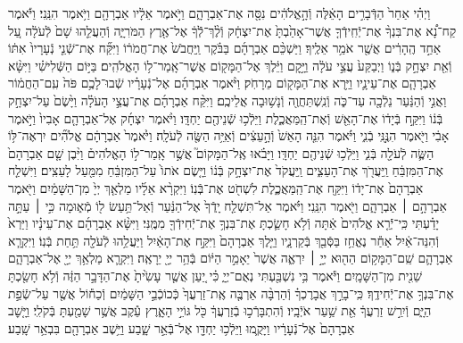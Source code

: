 \documentclass[twoside, openany, parskip=half, 11pt]{book}
\begin{document}
וַיְהִ֗י אַחַר֙ הַדְּֿבָרִ֣ים הָאֵ֔לֶּה  וְֿהָ֣אֱלֹהִ֔ים נִסָּ֖ה אֶת־אַבְרָהָ֑ם וַיֹּ֣אמֶר אֵלָ֔יו אַבְרָהָ֖ם וַיֹּ֥אמֶר הִנֵּֽנִי׃ וַיֹּ֡אמֶר קַח־נָ֠א אֶת־בִּנְךָ֨ אֶת־יְֿחִֽידְֿךָ֤ אֲשֶׁר־אָהַ֙בְתָּ֙ אֶת־יִצְחָ֔ק וְֿלֶ֨ךְ־לְֿֿךָ֔ אֶל־אֶ֖רֶץ הַמֹּרִיָּ֑ה וְֿהַעֲלֵ֤הוּ שָׁם֙ לְֿעֹלָ֔ה עַ֚ל אַחַ֣ד הֶֽהָרִ֔ים אֲשֶׁ֖ר אֹמַ֥ר אֵלֶֽיךָ׃ וַיַּשְׁכֵּ֨ם אַבְרָהָ֜ם בַּבֹּ֗קֶר וַֽיַּחֲבֹשׁ֙ אֶת־חֲמֹר֔וֹ וַיִּקַּ֞ח אֶת־שְֿׁנֵ֤י נְֿעָרָיו֙ אִתּ֔וֹ וְֿאֵ֖ת יִצְחָ֣ק בְּֿנ֑וֹ וַיְבַקַּע֙ עֲצֵ֣י עֹלָ֔ה וַיָּ֣קׇם וַיֵּ֔לֶךְ אֶל־הַמָּק֖וֹם אֲשֶׁר־אָֽמַר־ל֥וֹ הָאֱלֹהִֽים׃ בַּיּ֣וֹם הַשְּֿׁלִישִׁ֗י וַיִּשָּׂ֨א אַבְרָהָ֧ם אֶת־עֵינָ֛יו וַיַּ֥רְא אֶת־הַמָּק֖וֹם מֵרָחֹֽק׃ וַיֹּ֨אמֶר אַבְרָהָ֜ם אֶל־נְֿעָרָ֗יו שְֿׁבוּ־לָכֶ֥ם פֹּה֙ עִֽם־הַחֲמ֔וֹר וַאֲנִ֣י וְֿהַנַּ֔עַר נֵלְֿכָ֖ה עַד־כֹּ֑ה וְֿנִֽשְׁתַּחֲוֶ֖ה וְֿנָשׁ֥וּבָה אֲלֵיכֶֽם׃ וַיִּקַּ֨ח אַבְרָהָ֜ם אֶת־עֲצֵ֣י הָעֹלָ֗ה וַיָּ֙שֶׂם֙ עַל־יִצְחָ֣ק בְּֿנ֔וֹ וַיִּקַּ֣ח בְּֿיָד֔וֹ אֶת־הָאֵ֖שׁ וְֿאֶת־הַֽמַּאֲכֶ֑לֶת וַיֵּלְֿכ֥וּ שְֿׁנֵיהֶ֖ם יַחְדָּֽו׃ וַיֹּ֨אמֶר יִצְחָ֜ק אֶל־אַבְרָהָ֤ם אָבִיו֙ וַיֹּ֣אמֶר אָבִ֔י וַיֹּ֖אמֶר הִנֶּ֣נִּֽי בְֿנִ֑י וַיֹּ֗אמֶר הִנֵּ֤ה הָאֵשׁ֙ וְֿהָ֣עֵצִ֔ים וְֿאַיֵּ֥ה הַשֶּׂ֖ה לְֿעֹלָֽה׃ וַיֹּ֙אמֶר֙ אַבְרָהָ֔ם אֱלֹהִ֞ים יִרְאֶה־לּ֥וֹ הַשֶּׂ֛ה לְֿעֹלָ֖ה בְּֿנִ֑י וַיֵּלְֿכ֥וּ שְֿׁנֵיהֶ֖ם יַחְדָּֽו׃ וַיָּבֹ֗אוּ אֶֽל־הַמָּקוֹם֮ אֲשֶׁ֣ר אָֽמַר־ל֣וֹ הָאֱלֹהִים֒ וַיִּ֨בֶן שָׁ֤ם אַבְרָהָם֙ אֶת־הַמִּזְבֵּ֔חַ וַֽיַּעֲרֹ֖ךְ אֶת־הָעֵצִ֑ים וַֽיַּעֲקֹד֙ אֶת־יִצְחָ֣ק בְּֿנ֔וֹ וַיָּ֤שֶׂם אֹתוֹ֙ עַל־הַמִּזְבֵּ֔חַ מִמַּ֖עַל לָעֵצִֽים׃ וַיִּשְׁלַ֤ח אַבְרָהָם֙ אֶת־יָד֔וֹ וַיִּקַּ֖ח אֶת־הַֽמַּאֲכֶ֑לֶת לִשְׁחֹ֖ט אֶת־בְּֿנֽוֹ׃ וַיִּקְרָ֨א אֵלָ֜יו מַלְאַ֤ךְ יְיָ֙ מִן־הַשָּׁמַ֔יִם וַיֹּ֖אמֶר אַבְרָהָ֣ם ׀ אַבְרָהָ֑ם וַיֹּ֖אמֶר הִנֵּֽנִי׃ וַיֹּ֗אמֶר אַל־תִּשְׁלַ֤ח יָֽדְֿךָ֙ אֶל־הַנַּ֔עַר וְֿאַל־תַּ֥עַשׂ ל֖וֹ מְֿא֑וּמָה כִּ֣י ׀ עַתָּ֣ה יָדַ֗עְתִּי כִּֽי־יְֿֿרֵ֤א אֱלֹהִים֙ אַ֔תָּה וְֿלֹ֥א חָשַׂ֛כְתָּ אֶת־בִּנְךָ֥ אֶת־יְֿחִידְֿךָ֖ מִמֶּֽנִּי׃ וַיִּשָּׂ֨א אַבְרָהָ֜ם אֶת־עֵינָ֗יו וַיַּרְא֙ וְֿהִנֵּה־אַ֔יִל אַחַ֕ר נֶאֱחַ֥ז בַּסְּֿבַ֖ךְ בְּֿקַרְנָ֑יו וַיֵּ֤לֶךְ אַבְרָהָם֙ וַיִּקַּ֣ח אֶת־הָאַ֔יִל וַיַּעֲלֵ֥הוּ לְֿעֹלָ֖ה תַּ֥חַת בְּֿנֽוֹ׃ וַיִּקְרָ֧א אַבְרָהָ֛ם שֵֽׁם־הַמָּק֥וֹם הַה֖וּא יְיָ֣ ׀ יִרְאֶ֑ה אֲשֶׁר֙ יֵאָמֵ֣ר הַיּ֔וֹם בְּֿהַ֥ר יְיָ֖ יֵרָאֶֽה׃ וַיִּקְרָ֛א מַלְאַ֥ךְ יְיָ֖ אֶל־אַבְרָהָ֑ם שֵׁנִ֖ית מִן־הַשָּׁמָֽיִם׃ וַיֹּ֕אמֶר בִּ֥י נִשְׁבַּ֖עְתִּי נְאֻם־יְיָ֑ כִּ֗י יַ֚עַן אֲשֶׁ֤ר עָשִׂ֙יתָ֙ אֶת־הַדָּבָ֣ר הַזֶּ֔ה וְֿלֹ֥א חָשַׂ֖כְתָּ אֶת־בִּנְךָ֥ אֶת־יְֿחִידֶֽךָ׃ כִּֽי־בָרֵ֣ךְ אֲבָרֶכְךָ֗ וְֿהַרְבָּ֨ה אַרְבֶּ֤ה אֶֽת־זַרְעֲךָ֙ כְּֿכוֹכְֿבֵ֣י הַשָּׁמַ֔יִם וְֿכַח֕וֹל אֲשֶׁ֖ר עַל־שְֿׂפַ֣ת הַיָּ֑ם וְֿיִרַ֣שׁ זַרְעֲךָ֔ אֵ֖ת שַׁ֥עַר אֹיְֿבָֽיו׃ וְֿהִתְבָּרְֿכ֣וּ בְֿזַרְעֲךָ֔ כֹּ֖ל גּוֹיֵ֣י הָאָ֑רֶץ עֵ֕קֶב אֲשֶׁ֥ר שָׁמַ֖עְתָּ בְּֿקֹלִֽי׃ וַיָּ֤שׇׁב אַבְרָהָם֙ אֶל־נְֿעָרָ֔יו וַיָּקֻ֛מוּ וַיֵּלְֿכ֥וּ יַחְדָּ֖ו אֶל־בְּֿאֵ֣ר שָׁ֑בַע וַיֵּ֥שֶׁב אַבְרָהָ֖ם בִּבְאֵ֥ר שָֽׁבַע׃
\end{document}
